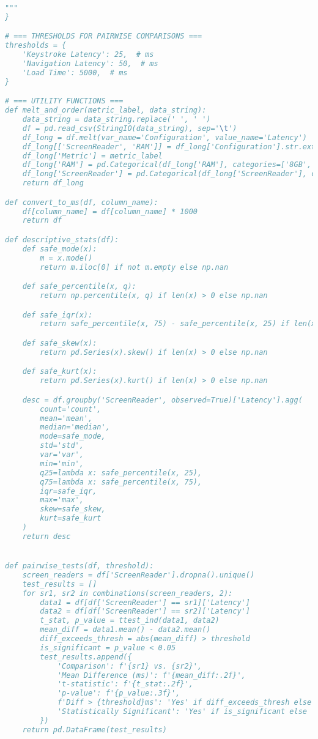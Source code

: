 \begin{lstlisting}[language=Python]
"""
}

# === THRESHOLDS FOR PAIRWISE COMPARISONS ===
thresholds = {
    'Keystroke Latency': 25,  # ms
    'Navigation Latency': 50,  # ms
    'Load Time': 5000,  # ms
}

# === UTILITY FUNCTIONS ===
def melt_and_order(metric_label, data_string):
    data_string = data_string.replace(' ', ' ')
    df = pd.read_csv(StringIO(data_string), sep='\t')
    df_long = df.melt(var_name='Configuration', value_name='Latency')
    df_long[['ScreenReader', 'RAM']] = df_long['Configuration'].str.extract(r'([A-Z]+)(\d+GB)')
    df_long['Metric'] = metric_label
    df_long['RAM'] = pd.Categorical(df_long['RAM'], categories=['8GB', '16GB', '24GB', '32GB', '64GB'], ordered=True)
    df_long['ScreenReader'] = pd.Categorical(df_long['ScreenReader'], categories=SR_ORDER, ordered=True)
    return df_long

def convert_to_ms(df, column_name):
    df[column_name] = df[column_name] * 1000
    return df

def descriptive_stats(df):
    def safe_mode(x):
        m = x.mode()
        return m.iloc[0] if not m.empty else np.nan

    def safe_percentile(x, q):
        return np.percentile(x, q) if len(x) > 0 else np.nan

    def safe_iqr(x):
        return safe_percentile(x, 75) - safe_percentile(x, 25) if len(x) > 0 else np.nan

    def safe_skew(x):
        return pd.Series(x).skew() if len(x) > 0 else np.nan

    def safe_kurt(x):
        return pd.Series(x).kurt() if len(x) > 0 else np.nan

    desc = df.groupby('ScreenReader', observed=True)['Latency'].agg(
        count='count',
        mean='mean',
        median='median',
        mode=safe_mode,
        std='std',
        var='var',
        min='min',
        q25=lambda x: safe_percentile(x, 25),
        q75=lambda x: safe_percentile(x, 75),
        iqr=safe_iqr,
        max='max',
        skew=safe_skew,
        kurt=safe_kurt
    )
    return desc


def pairwise_tests(df, threshold):
    screen_readers = df['ScreenReader'].dropna().unique()
    test_results = []
    for sr1, sr2 in combinations(screen_readers, 2):
        data1 = df[df['ScreenReader'] == sr1]['Latency']
        data2 = df[df['ScreenReader'] == sr2]['Latency']
        t_stat, p_value = ttest_ind(data1, data2)
        mean_diff = data1.mean() - data2.mean()
        diff_exceeds_thresh = abs(mean_diff) > threshold
        is_significant = p_value < 0.05
        test_results.append({
            'Comparison': f'{sr1} vs. {sr2}',
            'Mean Difference (ms)': f'{mean_diff:.2f}',
            't-statistic': f'{t_stat:.2f}',
            'p-value': f'{p_value:.3f}',
            f'Diff > {threshold}ms': 'Yes' if diff_exceeds_thresh else 'No',
            'Statistically Significant': 'Yes' if is_significant else 'No'
        })
    return pd.DataFrame(test_results)


\end{lstlisting}
